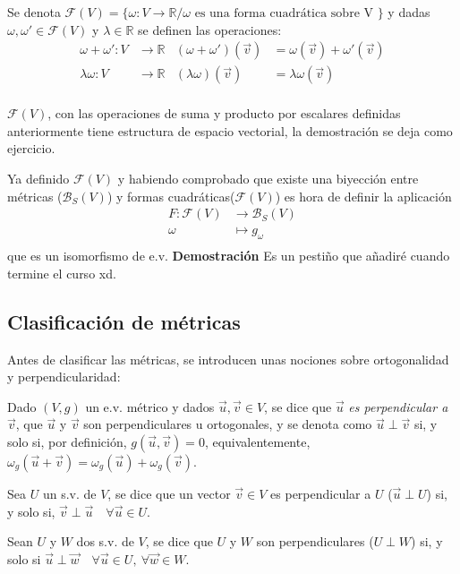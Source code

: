 \documentclass[x11names,table]{report}
\begin{document}
Se denota $\mathcal{F}(V)=\{\omega:V\longrightarrow\mathbb{R}/\omega \text{ es una forma cuadrática sobre V }\}$ y  dadas $\omega,\omega'\in\mathcal{F}(V)$ y $\lambda\in\mathbb{R}$ se definen las operaciones:
\begin{align*}
\omega+\omega':V&\longrightarrow\mathbb{R} & (\omega+\omega')(\vec{v})&=\omega(\vec{v})+\omega'(\vec{v})\\
\lambda\omega:V&\longrightarrow\mathbb{R} & (\lambda\omega)(\vec{v})&=\lambda\omega(\vec{v})\\
\end{align*}

$\mathcal{F}(V)$, con las operaciones de suma y producto por escalares definidas anteriormente tiene estructura de espacio vectorial, la demostración se deja como ejercicio.

Ya definido $\mathcal{F}(V)$ y habiendo comprobado que existe una biyección entre métricas ($\mathcal{B}_S(V)$) y formas cuadráticas($\mathcal{F}(V)$) es hora de definir la aplicación 
\[\begin{split}
F:\mathcal{F}(V)&\longrightarrow\mathcal{B}_S(V)\\
\omega&\longmapsto g_\omega\\
\end{split}\]
que es un isomorfismo de e.v.
\textbf{Demostración}
Es un pestiño que añadiré cuando termine el curso xd.

\subsection{Clasificación de métricas}
Antes de clasificar las métricas, se introducen unas nociones sobre ortogonalidad y perpendicularidad:

Dado $(V,g)$ un e.v. métrico y dados $\vec{u},\vec{v}\in V$, se dice que $\vec{u}$\textit{ es perpendicular a }$\vec{v}$, que $\vec{u}$ y $\vec{v}$ son perpendiculares u ortogonales, y se denota como $\vec{u}\perp\vec{v}$ si, y solo si, por definición, $g(\vec{u},\vec{v})=0$, equivalentemente, $\omega_g(\vec{u}+\vec{v})=\omega_g(\vec{u})+\omega_g(\vec{v})$.

Sea $U$ un s.v. de $V$, se dice que un vector $\vec{v}\in V$ es perpendicular a $U$ ($\vec{u}\perp U$) si, y solo si, $\vec{v}\perp\vec{u}\quad\forall\vec{u}\in U$.

Sean $U$ y $W$ dos s.v. de $V$, se dice que $U$ y $W$ son perpendiculares ($U\perp W$) si, y solo si $\vec{u}\perp\vec{w}\quad\forall\vec{u}\in U,  \ \forall\vec{w}\in W$.
\end{document}
